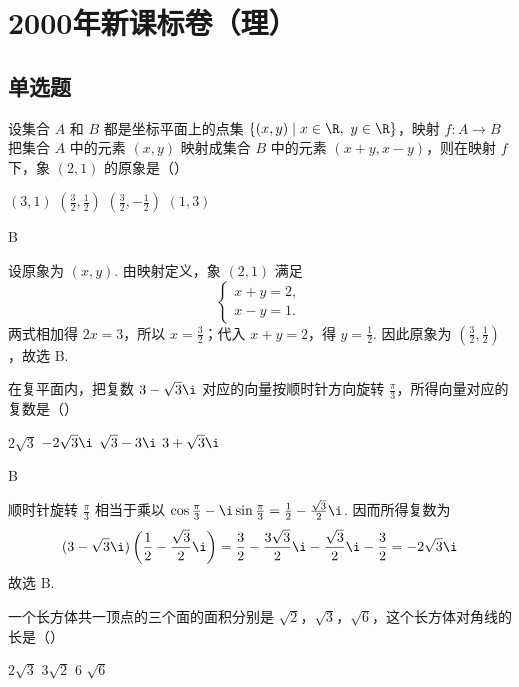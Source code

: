 \chapter{2000年新课标卷（理）}
\section{单选题}
\begin{problem}
设集合 \(A\) 和 \(B\) 都是坐标平面上的点集 \(\{(x, y) \mid x \in \R,\ y \in \R\}\)，映射 \(f: A \to B\) 把集合 \(A\) 中的元素 \((x, y)\) 映射成集合 \(B\) 中的元素 \((x + y, x - y)\)，则在映射 \(f\) 下，象 \((2, 1)\) 的原象是（\quad）

\choices
    {\((3, 1)\)}
    {\(\left(\frac{3}{2}, \frac{1}{2}\right)\)}
    {\(\left(\frac{3}{2}, -\frac{1}{2}\right)\)}
    {\((1, 3)\)}
\end{problem}

\begin{answer}
B
\end{answer}

\begin{solution}
设原象为 \((x,y)\). 由映射定义，象 \((2,1)\) 满足
\[
\begin{cases}
x+y=2,\\
x-y=1.
\end{cases}
\]
两式相加得 \(2x=3\)，所以 \(x=\frac{3}{2}\)；代入 \(x+y=2\)，得 \(y=\frac{1}{2}\). 因此原象为 \(\left(\frac{3}{2},\frac{1}{2}\right)\)，故选 B.
\end{solution}

\begin{problem}
在复平面内，把复数 \(3 - \sqrt{3}\i\) 对应的向量按顺时针方向旋转 \(\frac{\pi}{3}\)，所得向量对应的复数是（\quad）

\choices
    {\(2\sqrt{3}\)}
    {\(-2\sqrt{3}\i\)}
    {\(\sqrt{3} - 3\i\)}
    {\(3 + \sqrt{3}\i\)}
\end{problem}

\begin{answer}
B
\end{answer}

\begin{solution}
顺时针旋转 \(\frac{\pi}{3}\) 相当于乘以
\(\cos\frac{\pi}{3}-\i\sin\frac{\pi}{3}=\frac{1}{2}-\frac{\sqrt{3}}{2}\i\). 因而所得复数为
\[
(3-\sqrt{3}\i)\left(\frac{1}{2}-\frac{\sqrt{3}}{2}\i\right)
=\frac{3}{2}-\frac{3\sqrt{3}}{2}\i-\frac{\sqrt{3}}{2}\i-\frac{3}{2}
=-2\sqrt{3}\i
\]
故选 B.
\end{solution}

\begin{problem}
一个长方体共一顶点的三个面的面积分别是 \(\sqrt{2}\)，\(\sqrt{3}\)，\(\sqrt{6}\)，这个长方体对角线的长是（\quad）

\choices
    {\(2\sqrt{3}\)}
    {\(3\sqrt{2}\)}
    {\(6\)}
    {\(\sqrt{6}\)}
\end{problem}

